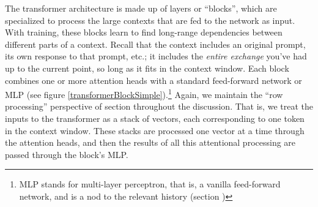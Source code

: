 The transformer architecture \cite{vaswani2017attention} is made up of layers
or ``blocks'', which are specialized to process the large contexts that are fed
to the network as input. With training, these blocks learn to find long-range
dependencies between different parts of a context. Recall that the context
includes an original prompt, its own response to that prompt, etc.; it includes
the \emph{entire exchange} you've had up to the current point, so long
as it fits in the context window. Each block combines one or more attention heads with a standard feed-forward network or MLP (see figure \ref{transformerBlockSimple}).\footnote{MLP stands for multi-layer perceptron, that is, a vanilla feed-forward network, and is a nod to the relevant history (section )}
Again, we maintain the ``row processing'' perspective of section
 throughout the discussion. That is, we treat the inputs to the transformer as a stack of vectors, each corresponding to one token in the context window. These stacks are processed one vector at a time through the attention heads, and then the results of all this attentional processing are passed through the block's MLP.

